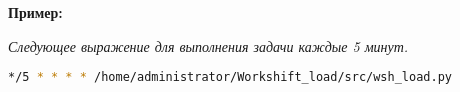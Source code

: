 \begin{itemize}
\newpage	
	\textbf{Пример:}
	
	\textsl {Следующее выражение для выполнения задачи каждые 5 минут.}
	\begin{tcolorbox}
		
		\begin{lstlisting}[language=bash]
*/5 * * * * /home/administrator/Workshift_load/src/wsh_load.py
		\end{lstlisting}
	\end{tcolorbox}
	
	
\end{itemize}
